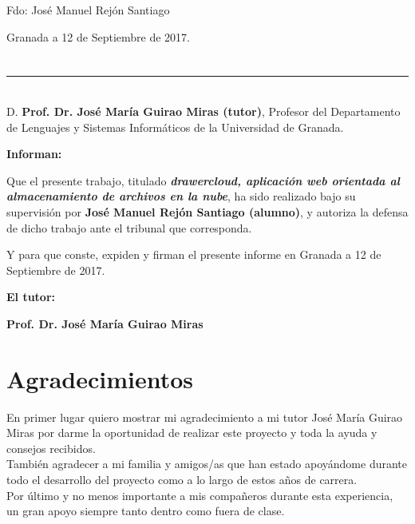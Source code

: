 \vspace{6cm}

\noindent Fdo: José Manuel Rejón Santiago

\vspace{2cm}

\begin{flushright}
Granada a 12 de Septiembre de 2017.
\end{flushright}


\chapter*{}
\thispagestyle{empty}

\noindent\rule[-1ex]{\textwidth}{2pt}\\[4.5ex]

D. \textbf{Prof. Dr. José María Guirao Miras (tutor)}, Profesor del Departamento de Lenguajes y Sistemas Informáticos de la Universidad de Granada.

\vspace{0.5cm}

\textbf{Informan:}

\vspace{0.5cm}

Que el presente trabajo, titulado \textit{\textbf{drawercloud, aplicación web orientada al almacenamiento de archivos en la nube}},
ha sido realizado bajo su supervisión por \textbf{José Manuel Rejón Santiago (alumno)}, y autoriza la defensa de dicho trabajo ante el tribunal
que corresponda.

\vspace{0.5cm}

Y para que conste, expiden y firman el presente informe en Granada a 12 de Septiembre de 2017.

\vspace{1cm}

\textbf{El tutor:}

\vspace{5cm}

\noindent \textbf{Prof. Dr. José María Guirao Miras}

\chapter*{Agradecimientos}
\thispagestyle{empty}

       \vspace{1cm}


En primer lugar quiero mostrar mi agradecimiento a mi tutor José María Guirao Miras por darme la oportunidad de realizar este proyecto y toda la ayuda y consejos recibidos. \\

También agradecer a mi familia y amigos/as que han estado apoyándome durante todo el desarrollo del proyecto como a lo largo de estos años de carrera. \\

Por último y no menos importante a mis compañeros durante esta experiencia, un gran apoyo siempre tanto dentro como fuera de clase.



